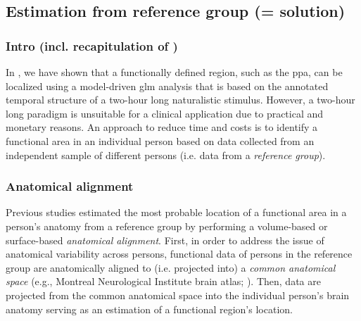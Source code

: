\subsection{Estimation from reference group (= solution)}

\subsubsection{Intro (incl. recapitulation of \citet{haeusler2022processing})}


In \citet{haeusler2022processing}, we have shown that a functionally
defined region, such as the \ac{ppa}, can be localized using a model-driven
\ac{glm} analysis that is based on the annotated temporal structure of a
two-hour long naturalistic stimulus.
However, a two-hour long paradigm is unsuitable for a clinical application due
to practical and monetary reasons.
An approach to reduce time and costs is to identify a functional area in an
individual person based on data collected from an independent sample of
different persons (i.e. data from a \textit{reference group}).



\subsubsection{Anatomical alignment}

Previous studies estimated the most probable location of a functional area in a
person's anatomy from a reference group by performing a volume-based
\citep[e.g.,][]{zhen2017quantifying, zhen2015quantifying} or surface-based
\citep[e.g.,][]{frost2012measuring, weiner2018defining,
rosenke2021probabilistic, wang2015probabilistic} \textit{anatomical alignment}.
%
First, in order to address the issue of anatomical variability across persons,
functional data of persons in the reference group are anatomically aligned to
(i.e.  projected into) a \textit{common anatomical space} (e.g., Montreal
Neurological Institute brain atlas; \citep[MNI152,][]{fonov2011unbiased}).
Then, data are projected from the common anatomical space into the individual
person's brain anatomy serving as an estimation of a functional region's
location.

